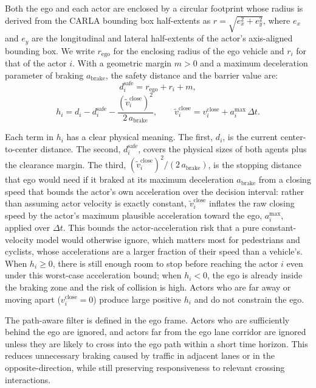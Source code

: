 Both the ego and each actor are enclosed by a circular footprint whose radius is derived from the CARLA bounding box half-extents as $r = \sqrt{e_x^2 + e_y^2}$, where $e_x$ and $e_y$ are the longitudinal and lateral half-extents of the actor's axis-aligned bounding box. We write $r_{\text{ego}}$ for the enclosing radius of the ego vehicle and $r_i$ for that of the actor $i$. With a geometric margin $m > 0$ and a maximum deceleration parameter of braking  $a_{\text{brake}}$, the safety distance and the barrier value are:
\begin{equation}
d_i^{\text{safe}} = r_{\text{ego}} + r_i + m,
\end{equation}
\begin{equation}
h_i = d_i - d_i^{\text{safe}} - \frac{(\tilde v_i^{\text{close}})^2}{2\,a_{\text{brake}}}, \qquad
\tilde v_i^{\text{close}} = v_i^{\text{close}} + a_i^{\max}\,\Delta t.
\end{equation}

Each term in $h_i$ has a clear physical meaning. The first, $d_i$, is the current center-to-center distance. The second, $d_i^{\text{safe}}$, covers the physical sizes of both agents plus the clearance margin. The third, $(\tilde v_i^{\text{close}})^2 / (2\, a_{\text{brake}})$, is the stopping distance that ego would need if it braked at its maximum deceleration $a_{\text{brake}}$ from a closing speed that bounds the actor's own acceleration over the decision interval: rather than assuming actor velocity is exactly constant, $\tilde v_i^{\text{close}}$ inflates the raw closing speed by the actor's maximum plausible acceleration toward the ego, $a_i^{\max}$, applied over $\Delta t$. This bounds the actor-acceleration risk that a pure constant-velocity model would otherwise ignore, which matters most for pedestrians and cyclists, whose accelerations are a larger fraction of their speed than a vehicle's. When $h_i \ge 0$, there is still enough room to stop before reaching the actor $i$ even under this worst-case acceleration bound; when $h_i < 0$, the ego is already inside the braking zone and the risk of collision is high. Actors who are far away or moving apart ($v_i^{\text{close}} = 0$) produce large positive $h_i$ and do not constrain the ego.


The path-aware filter is defined in the ego frame. Actors who are sufficiently behind the ego are ignored, and actors far from the ego lane corridor are ignored unless they are likely to cross into the ego path within a short time horizon. This reduces unnecessary braking caused by traffic in adjacent lanes or in the opposite-direction, while still preserving responsiveness to relevant crossing interactions.

